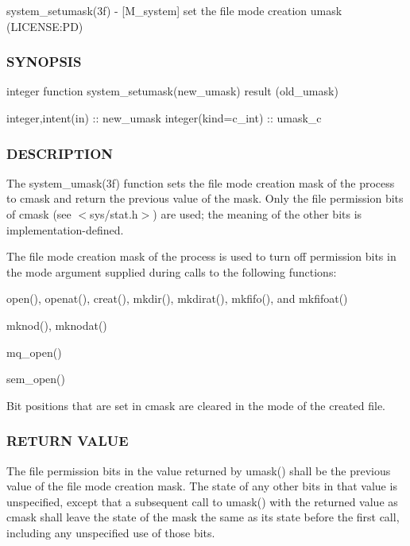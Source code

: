 system\+\_\+setumask(3f) -\/ \mbox{[}M\+\_\+system\mbox{]} set the file mode creation umask (L\+I\+C\+E\+N\+SE\+:PD) \subsubsection*{S\+Y\+N\+O\+P\+S\+IS}

integer function system\+\_\+setumask(new\+\_\+umask) result (old\+\_\+umask)

integer,intent(in) \+:\+: new\+\_\+umask integer(kind=c\+\_\+int) \+:\+: umask\+\_\+c

\subsubsection*{D\+E\+S\+C\+R\+I\+P\+T\+I\+ON}

The system\+\_\+umask(3f) function sets the file mode creation mask of the process to cmask and return the previous value of the mask. Only the file permission bits of cmask (see $<$sys/stat.\+h$>$) are used; the meaning of the other bits is implementation-\/defined.

The file mode creation mask of the process is used to turn off permission bits in the mode argument supplied during calls to the following functions\+:


\begin{DoxyItemize}
\item open(), openat(), creat(), mkdir(), mkdirat(), mkfifo(), and mkfifoat()
\item mknod(), mknodat()
\item mq\+\_\+open()
\item sem\+\_\+open()
\end{DoxyItemize}

Bit positions that are set in cmask are cleared in the mode of the created file.

\subsubsection*{R\+E\+T\+U\+RN V\+A\+L\+UE}

The file permission bits in the value returned by umask() shall be the previous value of the file mode creation mask. The state of any other bits in that value is unspecified, except that a subsequent call to umask() with the returned value as cmask shall leave the state of the mask the same as its state before the first call, including any unspecified use of those bits.

